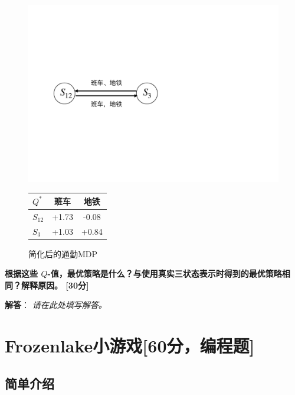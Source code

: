 \documentclass[a4paper,12pt]{article}
\begin{document}
\begin{enumerate}[label=(\roman*)]
\begin{figure}[h!]
\centering
\begin{minipage}[b]{0.48\linewidth}
    \centering
    \includegraphics[width=\linewidth]{Q1_2.pdf}
    \caption{简化后的通勤MDP}
    \label{fig:Q1_2}
\end{minipage}
\hfill
\begin{minipage}[b]{0.45\linewidth}
    \centering
    \begin{tabular}{@{}lcc@{}}
        \toprule
        $Q^*$ & 班车 & 地铁 \\ \midrule
        $S_{12}$ & +1.73 & -0.08 \\
        $S_3$    & +1.03 & +0.84 \\ \bottomrule
    \end{tabular}
    \label{tab:Q1}
\end{minipage}
\end{figure}

\textbf{根据这些 $Q$-值，最优策略是什么？与使用真实三状态表示时得到的最优策略相同？解释原因。 [30分]}  

\textbf{解答}：
    \emph{请在此处填写解答。}
    \vspace{1cm}


\end{enumerate}

\section{Frozenlake小游戏[60分，编程题]}

\subsection{简单介绍}
\end{document}
